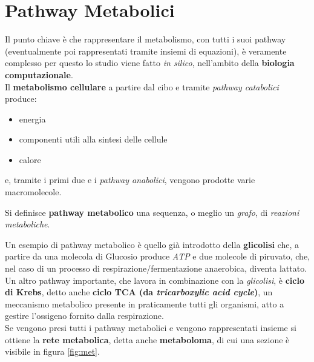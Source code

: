 \documentclass[a4paper,12pt, oneside]{book}
\begin{document}
\section{Pathway Metabolici}
Il punto chiave è
che rappresentare il metabolismo, con tutti i suoi pathway (eventualmente poi
rappresentati tramite insiemi di equazioni), è veramente
complesso per questo lo studio viene fatto \textit{in silico}, nell'ambito della
\textbf{biologia computazionale}.\\
Il \textbf{metabolismo cellulare} a partire dal cibo e tramite \textit{pathway
  catabolici} produce:
\begin{itemize}
  \item energia
  \item componenti utili alla sintesi delle cellule
  \item calore
\end{itemize}
e, tramite i primi due e i \textit{pathway anabolici}, vengono prodotte varie
macromolecole.
\begin{definizione}
  Si definisce \textbf{pathway metabolico} una sequenza, o meglio un
  \emph{grafo}, di \emph{reazioni metaboliche}.
\end{definizione}
Un esempio di pathway metabolico è quello già introdotto della
\textbf{glicolisi} che, a partire da una molecola di Glucosio produce
\textit{ATP} e due molecole di piruvato, che, nel caso di un processo di
respirazione/fermentazione anaerobica, diventa lattato.\\ 
Un altro pathway importante, che lavora in combinazione con la
\textit{glicolisi}, è \textbf{ciclo di Krebs}, detto anche \textbf{ciclo TCA
  (da \textit{tricarboxylic acid cycle})}, un meccanismo metabolico presente
in praticamente tutti gli organismi, atto a gestire l'ossigeno fornito dalla
respirazione. \\
Se vengono presi tutti i pathway metabolici e vengono rappresentati insieme si
ottiene la \textbf{rete metabolica}, detta anche \textbf{metaboloma}, di cui una
sezione è visibile in figura \ref{fig:met}.\\
\end{document}
